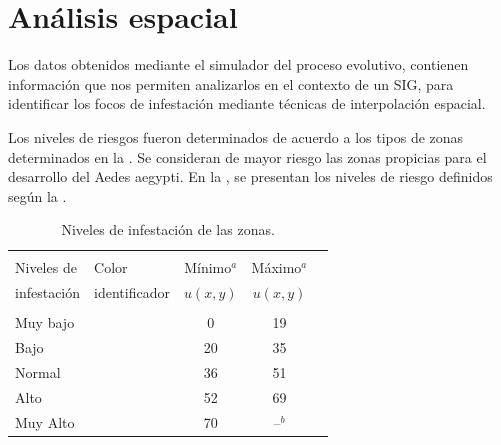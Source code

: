 \section {Análisis espacial}

Los datos obtenidos mediante el simulador del proceso evolutivo, contienen información que nos
permiten analizarlos en el contexto de un SIG, para identificar los focos de infestación mediante
técnicas de interpolación espacial.

Los niveles de riesgos fueron determinados de acuerdo a los tipos de zonas determinados en la
. Se consideran de mayor riesgo las zonas propicias para el
desarrollo del Aedes aegypti. En la , se presentan los niveles de
riesgo definidos según la .


\begin{table}[!hptb]
    \begin{minipage}{\textwidth}
\begin{center}
    \caption{\label{tab:niveles-riesgo-zonas} Niveles de infestación de las zonas.}
    \begin{tabular}{p{3cm} l c c c}
        \hline \\
         Niveles de  & Color & Mínimo$^a$ & Máximo$^a$ \\
         infestación & identificador & $u(x,y)$   & $u(x,y)$  \\
        \hline
        \hline\\
        Muy bajo  & \cellcolor{muybajo}& 0  & 19 \\
        Bajo    & \cellcolor{bajo}& 20 & 35 \\
        Normal & \cellcolor{normal}& 36 & 51 \\
        Alto   & \cellcolor{alto}& 52 & 69 \\
        Muy Alto & \cellcolor{muyalto} & 70 & --$^b$\\
    \end{tabular}
\end{center}
    \end{minipage}
\end{table}

